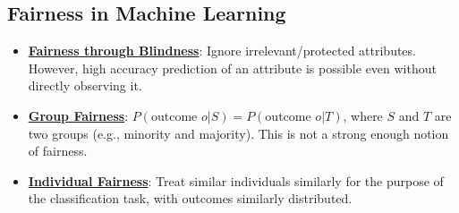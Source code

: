 \documentclass{article}%
\begin{document}
%
\subsection{Fairness in Machine Learning}%
\label{subsec:FairnessinMachineLearning}%
\begin{itemize}[leftmargin=*]%
\item \href{https://purdue.brightspace.com/d2l/common/assets/pdfjs-d2l-dist/1.0.14-legacy/web/viewer.html?file=\%2Fcontent\%2Fenforced\%2F1095465-WL.202510.CS24200.LE1\%2F25-ethics.pdf\%3Fou\%3D1095465\&lang=en-us\&container=d2l-fileviewer-rendered-pdf\&fullscreen=d2l-fileviewer-rendered-pdf-dialog\&height=667#page=23}{\textbf{Fairness through Blindness}}: Ignore irrelevant/protected attributes. However, high accuracy prediction of an attribute is possible even without directly observing it.%
\item \href{https://purdue.brightspace.com/d2l/common/assets/pdfjs-d2l-dist/1.0.14-legacy/web/viewer.html?file=\%2Fcontent\%2Fenforced\%2F1095465-WL.202510.CS24200.LE1\%2F25-ethics.pdf\%3Fou\%3D1095465\&lang=en-us\&container=d2l-fileviewer-rendered-pdf\&fullscreen=d2l-fileviewer-rendered-pdf-dialog\&height=667#page=24}{\textbf{Group Fairness}}: $P(\text{outcome } o | S) = P(\text{outcome } o | T)$, where $S$ and $T$ are two groups (e.g., minority and majority). This is not a strong enough notion of fairness.%
\item \href{https://purdue.brightspace.com/d2l/common/assets/pdfjs-d2l-dist/1.0.14-legacy/web/viewer.html?file=\%2Fcontent\%2Fenforced\%2F1095465-WL.202510.CS24200.LE1\%2F25-ethics.pdf\%3Fou\%3D1095465\&lang=en-us\&container=d2l-fileviewer-rendered-pdf\&fullscreen=d2l-fileviewer-rendered-pdf-dialog\&height=667#page=25}{\textbf{Individual Fairness}}: Treat similar individuals similarly for the purpose of the classification task, with outcomes similarly distributed.%
\end{itemize}

%
\end{document}
